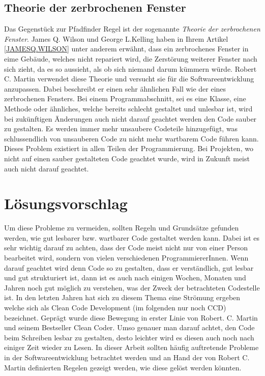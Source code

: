 \subsection{Theorie der zerbrochenen Fenster}
\SuperPar Das Gegenstück zur Pfadfinder Regel ist der sogenannte \textit{Theorie der zerbrochenen Fenster}. James Q. Wilson und George L.Kelling haben in Ihrem Artikel \ref{JAMESQ.WILSON} unter anderem erwähnt, dass ein zerbrochenes Fenster in eime Gebäude, welches nicht repariert wird, die Zerstörung weiterer Fenster nach sich zieht, da es so aussieht, als ob sich niemand darum kümmern würde. Robert C. Martin verwendet diese Theorie und versucht sie für die Softwareentwicklung anzupassen. Dabei beschreibt er einen sehr ähnlichen Fall wie der eines zerbrochenen Fensters. Bei einem Programmabschnitt, sei es eine Klasse, eine Methode oder ähnliches, welche bereits schlecht gestaltet und unlesbar ist, wird bei zukünftigen Änderungen auch nicht darauf geachtet werden den Code sauber zu gestalten. Es werden immer mehr unsaubere Codeteile hinzugefügt, was schlussendlich von unsauberen Code zu nicht mehr wartbarem Code führen kann. Dieses Problem existiert in allen Teilen der Programmierung. Bei Projekten, wo nicht auf einen sauber gestalteten Code geachtet wurde, wird in Zukunft meist auch nicht darauf geachtet. 

\section{Lösungsvorschlag}
\SuperPar Um diese Probleme zu vermeiden, sollten Regeln und Grundsätze gefunden werden, wie gut lesbarer bzw. wartbarer Code gestaltet werden kann. Dabei ist es sehr wichtig darauf zu achten, dass der Code meist nicht nur von einer Person bearbeitet wird, sondern von vielen verschiedenen ProgrammiererInnen. Wenn darauf geachtet wird denn Code so zu gestalten, dass er verständlich, gut lesbar und gut strukturiert ist, dann ist es auch nach einigen Wochen, Monaten und Jahren noch gut möglich zu verstehen, was der Zweck der betrachteten Codestelle ist. In den letzten Jahren hat sich zu diesem Thema eine Strömung ergeben welche sich als Clean Code Development (im folgenden nur noch CCD) bezeichnet. Geprägt wurde diese Bewegung in erster Linie von Robert. C. Martin und seinem Bestseller Clean Coder. Umso genauer man darauf achtet, den Code beim Schreiben lesbar zu gestalten, desto leichter wird es diesen auch noch nach einiger Zeit wieder zu Lesen. In dieser Arbeit sollten häufig auftretende Probleme in der Softwareentwicklung betrachtet werden und an Hand der von Robert C. Martin definierten Regelen gezeigt werden, wie diese gelöst werden könnten.

